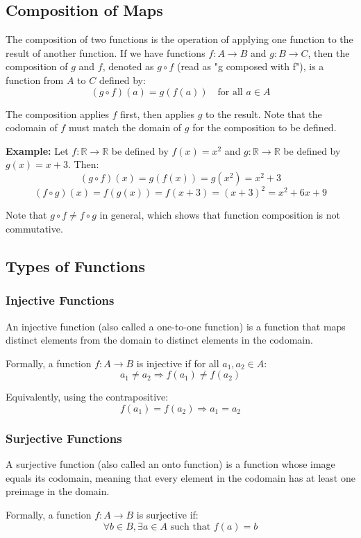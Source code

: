 \subsection{Composition of Maps}
The composition of two functions is the operation of applying one function to the result of another function. If we have functions $f: A \rightarrow B$ and $g: B \rightarrow C$, then the composition of $g$ and $f$, denoted as $g \circ f$ (read as "g composed with f"), is a function from $A$ to $C$ defined by:
\[
	(g \circ f)(a) = g(f(a)) \quad \text{for all } a \in A
\]

The composition applies $f$ first, then applies $g$ to the result. Note that the codomain of $f$ must match the domain of $g$ for the composition to be defined.

\textbf{Example:} Let $f: \mathbb{R} \rightarrow \mathbb{R}$ be defined by $f(x) = x^2$ and $g: \mathbb{R} \rightarrow \mathbb{R}$ be defined by $g(x) = x+3$. Then:
\[
	(g \circ f)(x) = g(f(x)) = g(x^2) = x^2 + 3
\]
\[
	(f \circ g)(x) = f(g(x)) = f(x+3) = (x+3)^2 = x^2 + 6x + 9
\]

Note that $g \circ f \neq f \circ g$ in general, which shows that function composition is not commutative.

\subsection{Types of Functions}
\subsubsection{Injective Functions}
An injective function (also called a one-to-one function) is a function that maps distinct elements from the domain to distinct elements in the codomain.

Formally, a function $f: A \rightarrow B$ is injective if for all $a_1, a_2 \in A$:
\[
	a_1 \neq a_2 \Rightarrow f(a_1) \neq f(a_2)
\]

Equivalently, using the contrapositive:
\[
	f(a_1) = f(a_2) \Rightarrow a_1 = a_2
\]

\subsubsection{Surjective Functions}
A surjective function (also called an onto function) is a function whose image equals its codomain, meaning that every element in the codomain has at least one preimage in the domain.

Formally, a function $f: A \rightarrow B$ is surjective if:
\[
	\forall b \in B, \exists a \in A \text{ such that } f(a) = b
\]

